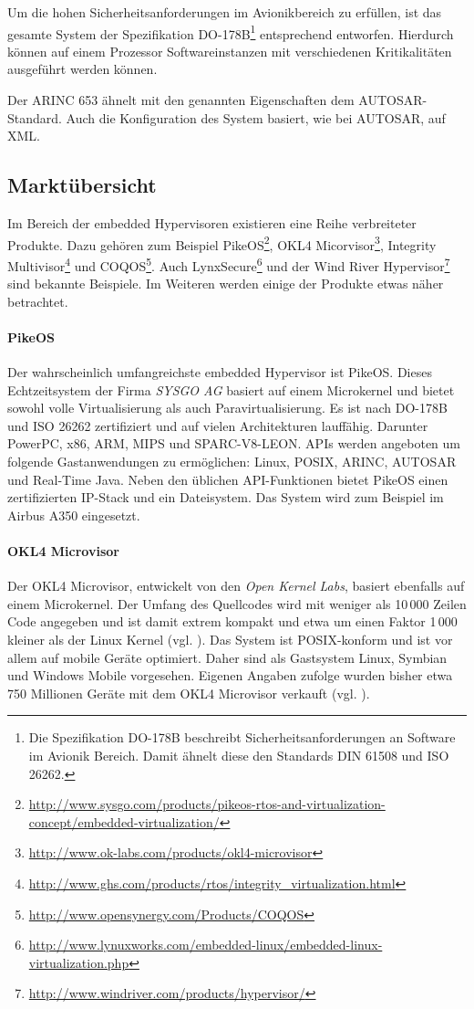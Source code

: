 \documentclass[
  a4paper,					    %
  twoside,
  DIV=calc,     				%
  bibliography=totoc,
  cleardoublepage=empty,
  ngerman,     					%
  final       					%
]{scrbook}
\begin{document}
Um die hohen Sicherheitsanforderungen im Avionikbereich zu erfüllen, ist das gesamte System der Spezifikation DO-178B\footnote{Die Spezifikation DO-178B beschreibt Sicherheitsanforderungen an Software im Avionik Bereich. Damit ähnelt diese den Standards DIN 61508 und ISO 26262.} entsprechend entworfen. Hierdurch können auf einem Prozessor Softwareinstanzen mit verschiedenen Kritikalitäten ausgeführt werden können. 

Der ARINC 653 ähnelt mit den genannten Eigenschaften dem AUTOSAR-Standard. Auch die Konfiguration des System basiert, wie bei AUTOSAR, auf XML.


\subsection{Marktübersicht}
Im Bereich der embedded Hypervisoren existieren eine Reihe verbreiteter Produkte. Dazu gehören zum Beispiel PikeOS\footnote{\url{http://www.sysgo.com/products/pikeos-rtos-and-virtualization-concept/embedded-virtualization/}}, OKL4 Micorvisor\footnote{\url{http://www.ok-labs.com/products/okl4-microvisor}}, Integrity Multivisor\footnote{\url{http://www.ghs.com/products/rtos/integrity_virtualization.html}} und COQOS\footnote{\url{http://www.opensynergy.com/Products/COQOS}}. Auch LynxSecure\footnote{\url{http://www.lynuxworks.com/embedded-linux/embedded-linux-virtualization.php}} und der Wind River Hypervisor\footnote{\url{http://www.windriver.com/products/hypervisor/}} sind bekannte Beispiele. Im Weiteren werden einige der Produkte etwas näher betrachtet.

\paragraph{PikeOS}
Der wahrscheinlich umfangreichste embedded Hypervisor ist PikeOS. Dieses Echtzeitsystem der Firma \emph{SYSGO AG} basiert auf einem Microkernel und bietet sowohl volle Virtualisierung als auch Paravirtualisierung. Es ist nach DO-178B und ISO 26262 zertifiziert und auf vielen Architekturen lauffähig. Darunter PowerPC, x86, ARM, MIPS und SPARC-V8-LEON. APIs werden angeboten um folgende Gastanwendungen zu ermöglichen: Linux, POSIX, ARINC, AUTOSAR und Real-Time Java. Neben den üblichen API-Funktionen bietet PikeOS einen zertifizierten IP-Stack und ein Dateisystem. Das System wird zum Beispiel im Airbus A350 eingesetzt.

\paragraph{OKL4 Microvisor}
Der OKL4 Microvisor, entwickelt von den \emph{Open Kernel Labs}, basiert ebenfalls auf einem Microkernel. Der Umfang des Quellcodes wird mit weniger als 10\,000 Zeilen Code angegeben und ist damit extrem kompakt und etwa um einen Faktor 1\,000 kleiner als der Linux Kernel (vgl. \cite{wiki:loc}). Das System ist POSIX-konform und ist vor allem auf mobile Geräte optimiert. Daher sind als Gastsystem Linux, Symbian und Windows Mobile vorgesehen. Eigenen Angaben zufolge wurden bisher etwa 750 Millionen Geräte mit dem OKL4 Microvisor verkauft (vgl. \cite{okl4}).
\end{document}
